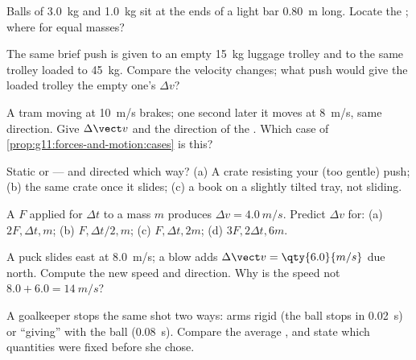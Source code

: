 \begin{exercise}[$\star$]\label{exo:g11:forces-and-motion:2}
Balls of \qty{3.0}{kg} and \qty{1.0}{kg} sit at the ends of a light bar
\qty{0.80}{m} long. Locate the ; where for equal masses?
\end{exercise}

\begin{exercise}[$\star$]\label{exo:g11:forces-and-motion:3}
The same brief push is given to an empty \qty{15}{kg} luggage trolley
and to the same trolley loaded to \qty{45}{kg}. Compare the velocity
changes; what push would give the loaded trolley the empty one's $\Delta v$?
\end{exercise}

\begin{exercise}[$\star$]\label{exo:g11:forces-and-motion:4}
A tram moving at \qty{10}{m/s} brakes; one second later it moves at
\qty{8}{m/s}, same direction. Give $\Delta \vect v$ and the direction of
the . Which case of \cref{prop:g11:forces-and-motion:cases} is this?
\end{exercise}

\begin{exercise}[$\star$]\label{exo:g11:forces-and-motion:5}
Static or  --- and directed which way? (a) A crate
resisting your (too gentle) push; (b) the same crate once it slides;
(c) a book on a slightly tilted tray, not sliding.
\end{exercise}

\begin{exercise}[$\star\star$]\label{exo:g11:forces-and-motion:6}
A  $F$ applied for $\Delta t$ to a mass $m$ produces
$\Delta v = \qty{4.0}{m/s}$. Predict $\Delta v$ for: (a) $2F, \Delta t, m$;
(b) $F, \Delta t/2, m$; (c) $F, \Delta t, 2m$; (d) $3F, 2\Delta t, 6m$.
\end{exercise}

\begin{exercise}[$\star\star$]\label{exo:g11:forces-and-motion:7}
A puck slides east at \qty{8.0}{m/s}; a blow adds
$\Delta \vect v = \qty{6.0}{m/s}$ due north. Compute the new speed and
direction. Why is the speed not $8.0 + 6.0 = \qty{14}{m/s}$?
\end{exercise}

\begin{exercise}[$\star\star$]\label{exo:g11:forces-and-motion:8}
A goalkeeper stops the same shot two ways: arms rigid (the ball stops in
\qty{0.02}{s}) or ``giving'' with the ball (\qty{0.08}{s}). Compare the
average , and state which quantities were fixed before she chose.
\end{exercise}

